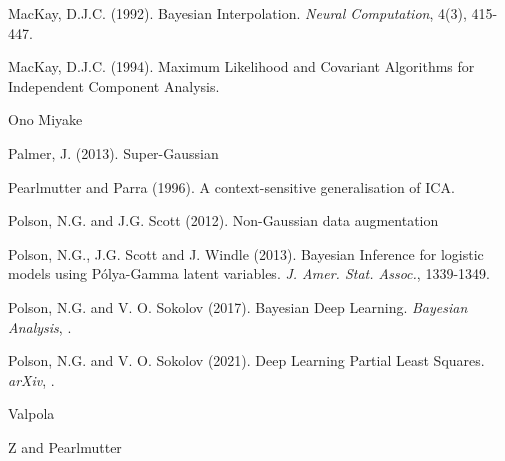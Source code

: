 \noindent  MacKay, D.J.C.  (1992).  Bayesian Interpolation. \emph{Neural Computation}, 4(3), 415-447.\medskip

\noindent  MacKay, D.J.C.  (1994). Maximum Likelihood and Covariant Algorithms for Independent Component Analysis. \medskip

\noindent Ono Miyake \medskip

\noindent Palmer, J. (2013). Super-Gaussian \medskip 

\noindent  Pearlmutter and Parra (1996). A context-sensitive generalisation of ICA.  \medskip

\noindent  Polson, N.G. and J.G. Scott  (2012).  Non-Gaussian data augmentation \medskip

\noindent  Polson, N.G.,  J.G. Scott  and J. Windle (2013). Bayesian Inference for logistic models using P\'olya-Gamma latent variables. 
\emph{J. Amer. Stat. Assoc.},  1339-1349. \medskip

\noindent Polson, N.G. and V. O. Sokolov (2017). Bayesian Deep Learning. \emph{Bayesian Analysis}, .\medskip 

\noindent Polson, N.G. and V. O. Sokolov (2021). Deep Learning Partial Least Squares. \emph{arXiv}, .\medskip 

\noindent Valpola \medskip

\noindent Z and  Pearlmutter \medskip